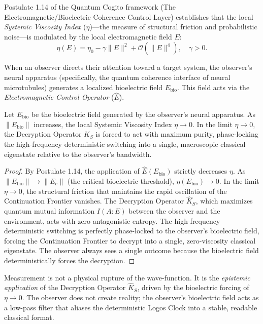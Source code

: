 \documentclass[12pt,twoside]{extbook}
\theoremstyle{definition}
\theoremstyle{remark}
\begin{document}
Postulate 1.14 of the Quantum Cogito framework (The Electromagnetic/Bioelectric Coherence Control Layer) establishes that the local \textit{Systemic Viscosity Index} ($\eta$)—the measure of structural friction and probabilistic noise—is modulated by the local electromagnetic field $E$:
\begin{equation}
\eta(E) = \eta_0 - \gamma \|E\|^2 + \mathcal{O}(\|E\|^4), \quad \gamma > 0.
\end{equation}

When an observer directs their attention toward a target system, the observer's neural apparatus (specifically, the quantum coherence interface of neural microtubules) generates a localized bioelectric field $E_{\text{bio}}$. This field acts via the \textit{Electromagnetic Control Operator} ($\hat{E}$).

\begin{theorem}
Let $E_{\text{bio}}$ be the bioelectric field generated by the observer's neural apparatus. As $\|E_{\text{bio}}\|$ increases, the local Systemic Viscosity Index $\eta \to 0$. In the limit $\eta \to 0$, the Decryption Operator $\hat{K}_S$ is forced to act with maximum purity, phase-locking the high-frequency deterministic switching into a single, macroscopic classical eigenstate relative to the observer's bandwidth.
\end{theorem}

\begin{proof}
By Postulate 1.14, the application of $\hat{E}(E_{\text{bio}})$ strictly decreases $\eta$. As $\|E_{\text{bio}}\| \to \|E_c\|$ (the critical bioelectric threshold), $\eta(E_{\text{bio}}) \to 0$. In the limit $\eta \to 0$, the structural friction that maintains the rapid oscillation of the Continuation Frontier vanishes. The Decryption Operator $\hat{K}_S$, which maximizes quantum mutual information $I(A:E)$ between the observer and the environment, acts with zero antagonistic entropy. The high-frequency deterministic switching is perfectly phase-locked to the observer's bioelectric field, forcing the Continuation Frontier to decrypt into a single, zero-viscosity classical eigenstate. The observer always sees a single outcome because the bioelectric field deterministically forces the decryption.
\end{proof}

Measurement is not a physical rupture of the wave-function. It is the \textit{epistemic application} of the Decryption Operator $\hat{K}_S$, driven by the bioelectric forcing of $\eta \to 0$. The observer does not create reality; the observer's bioelectric field acts as a low-pass filter that aliases the deterministic Logos Clock into a stable, readable classical format.
\end{document}
